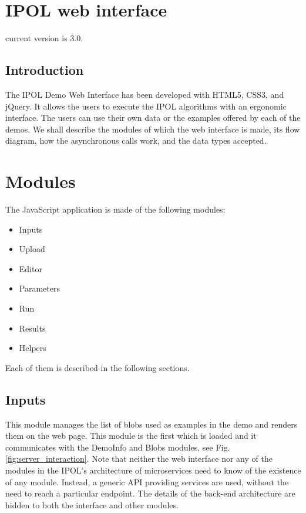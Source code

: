 \section{IPOL web interface}

current version is 3.0.

\subsection{Introduction}
The IPOL Demo Web Interface has been developed with HTML5, CSS3, and jQuery. 
It allows the users to execute the IPOL algorithms with an ergonomic interface. The users can use their own data or the examples offered by each of the demos. We shall describe the modules of which the web interface is made, its flow diagram, how the asynchronous calls work, and the data types accepted.

\section{Modules}
The JavaScript application is made of the following modules:

\begin{itemize}
	\item Inputs
	\item Upload
	\item Editor
	\item Parameters
	\item Run
	\item Results
	\item Helpers 
\end{itemize}

Each of them is described in the following sections.

\subsection{Inputs}
This module manages the list of blobs used as examples in the demo and renders them on the web page. This module is the first which is loaded and it communicates with the DemoInfo and Blobs modules, see Fig. \ref{fig:server_interaction}. Note that neither the web interface nor any of the modules in the IPOL's architecture of microservices need to know of the existence of any module. Instead, a generic API providing services are used, without the need to reach a particular endpoint. The details of the back-end architecture are hidden to both the interface and other modules.

